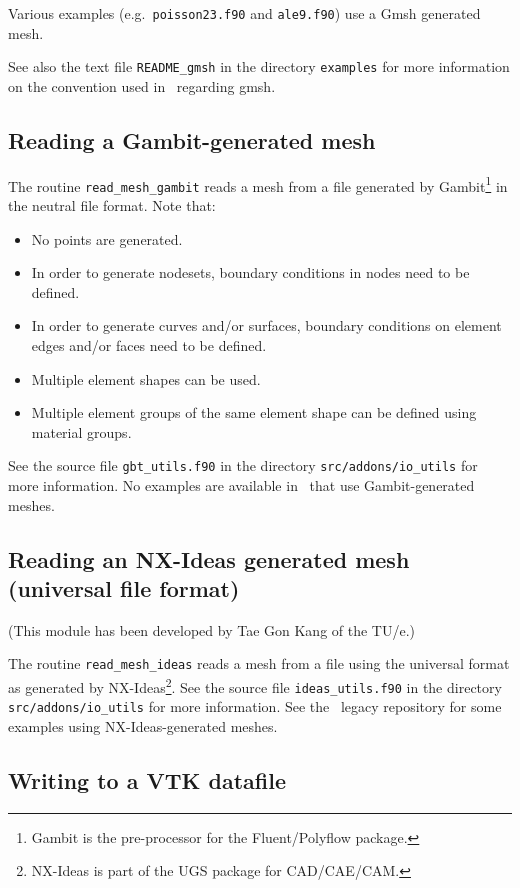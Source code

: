 Various examples (e.g.\ \texttt{poisson23.f90} and \texttt{ale9.f90}) use
a Gmsh generated mesh.

See also the text file \texttt{README\_gmsh} in the directory
\texttt{examples} for more information on the convention used
in \tfem\ regarding gmsh.

\subsection{Reading a Gambit-generated mesh}
\label{sec:readgbtmesh}

The routine \texttt{read\_mesh\_gambit} reads a mesh from a
file generated by Gambit\footnote{Gambit is the pre-processor
for the Fluent/Polyflow package.} in the neutral file format.
Note that:
\begin{itemize}
\item No points are generated.
\item
In order to generate nodesets, boundary conditions in nodes
need to be defined.
\item In order to generate curves and/or surfaces,
boundary conditions on element edges and/or faces need to be defined.
\item
Multiple element shapes can be used.
\item Multiple element groups of the same
element shape can be defined using material groups.
\end{itemize}
See the source file \texttt{gbt\_utils.f90} in the directory
\texttt{src/addons/io\_utils} for more information. No examples are available
in \tfem\ that use Gambit-generated meshes.

\subsection{Reading an NX-Ideas generated mesh (universal file format)}
\label{sec:readideasmesh}

(This module has been developed by Tae Gon Kang of the TU/e.)

The routine \texttt{read\_mesh\_ideas} reads a mesh from a file using
the universal format as
generated by NX-Ideas\footnote{NX-Ideas is part
of the UGS package for CAD/CAE/CAM.}.
See the source file \texttt{ideas\_utils.f90} in the directory
\texttt{src/addons/io\_utils} for more information.
See the \tfem\ legacy repository for some
examples using NX-Ideas-generated meshes.

\subsection{Writing to a VTK datafile}
\label{sec:vtk}

